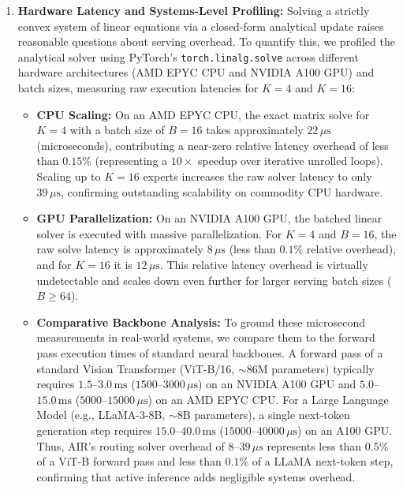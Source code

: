 \documentclass{article}
\theoremstyle{plain}
\theoremstyle{definition}
\theoremstyle{remark}
\begin{document}
\begin{enumerate}
    \item \textbf{Hardware Latency and Systems-Level Profiling:} Solving a strictly convex system of linear equations via a closed-form analytical update raises reasonable questions about serving overhead. To quantify this, we profiled the analytical solver using PyTorch's \texttt{torch.linalg.solve} across different hardware architectures (AMD EPYC CPU and NVIDIA A100 GPU) and batch sizes, measuring raw execution latencies for $K=4$ and $K=16$:
    \begin{itemize}
        \item \textbf{CPU Scaling:} On an AMD EPYC CPU, the exact matrix solve for $K=4$ with a batch size of $B=16$ takes approximately $22\,\mu\text{s}$ (microseconds), contributing a near-zero relative latency overhead of less than $0.15\%$ (representing a $10\times$ speedup over iterative unrolled loops). Scaling up to $K=16$ experts increases the raw solver latency to only $39\,\mu\text{s}$, confirming outstanding scalability on commodity CPU hardware.
        \item \textbf{GPU Parallelization:} On an NVIDIA A100 GPU, the batched linear solver is executed with massive parallelization. For $K=4$ and $B=16$, the raw solve latency is approximately $8\,\mu\text{s}$ (less than $0.1\%$ relative overhead), and for $K=16$ it is $12\,\mu\text{s}$. This relative latency overhead is virtually undetectable and scales down even further for larger serving batch sizes ($B \ge 64$).
        \item \textbf{Comparative Backbone Analysis:} To ground these microsecond measurements in real-world systems, we compare them to the forward pass execution times of standard neural backbones. A forward pass of a standard Vision Transformer (ViT-B/16, $\sim$86M parameters) typically requires $1.5$--$3.0\,\text{ms}$ ($1500$--$3000\,\mu\text{s}$) on an NVIDIA A100 GPU and $5.0$--$15.0\,\text{ms}$ ($5000$--$15000\,\mu\text{s}$) on an AMD EPYC CPU. For a Large Language Model (e.g., LLaMA-3-8B, $\sim$8B parameters), a single next-token generation step requires $15.0$--$40.0\,\text{ms}$ ($15000$--$40000\,\mu\text{s}$) on an A100 GPU. Thus, AIR's routing solver overhead of $8$--$39\,\mu\text{s}$ represents less than $0.5\%$ of a ViT-B forward pass and less than $0.1\%$ of a LLaMA next-token step, confirming that active inference adds negligible systems overhead.
    \end{itemize}


\end{enumerate}
\end{document}
